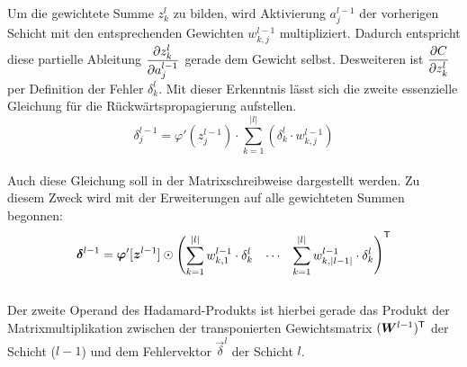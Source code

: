 \begin{appendices}
\begin{equation}
\end{equation}
\\
Um die gewichtete Summe $z_k^l$ zu bilden, wird
Aktivierung $a_j^{l-1}$ der vorherigen Schicht mit den entsprechenden Gewichten
$w_{k,j}^{l-1}$ multipliziert.
Dadurch entspricht diese partielle Ableitung $\displaystyle\frac{\partial z_k^l}{\partial a_j^{l-1}}$ gerade dem
Gewicht selbst. Desweiteren ist $\displaystyle\frac{\partial C}{\partial z_k^l}$ per Definition der
Fehler $\delta_k^l$. Mit dieser Erkenntnis lässt sich die zweite essenzielle
Gleichung  für die Rückwärtspropagierung aufstellen.
\\
\begin{equation}\tag{RP2}\label{eq:RP2}
  \delta_j^{l-1} = \varphi'(z_j^{l-1}) \cdot \sum_{k=1}^{|l|} \left( \delta_k^l \cdot w_{k,j}^{l-1} \right)
\end{equation}
\\
Auch diese Gleichung soll in der Matrixschreibweise dargestellt werden. Zu
diesem Zweck wird mit der Erweiterungen auf alle gewichteten Summen begonnen:
\\
\begin{equation*}
  \bm{\delta}^{l-1} = \bm{\varphi}'[\bm{z}^{l-1}] \odot \begin{pmatrix} \displaystyle\sum_{k=1}^{|l|} w_{k,1}^{l-1} \cdot \delta_k^l & \cdots & \displaystyle\sum_{k=1}^{|l|} w_{k,|l-1|}^{l-1} \cdot \delta_k^l \end{pmatrix}^{\mathsf{T}}
\end{equation*}
\\
Der zweite Operand des Hadamard-Produkts ist hierbei gerade das Produkt der
Matrixmultiplikation zwischen
der transponierten Gewichtsmatrix $(\bm{W}^{l-1})^{\mathsf{T}}$ der Schicht ($l-1$)
und dem Fehlervektor $\vec{\delta}^l$ der Schicht $l$.


\end{appendices}
